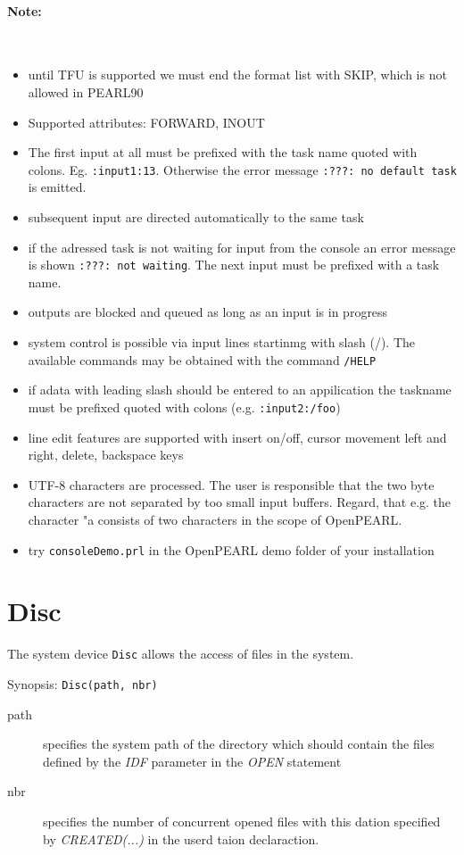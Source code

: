 \paragraph{Note:}\ 
\begin{itemize}
\item until TFU is supported we must end the format list with SKIP, 
   which is not allowed in PEARL90
\item Supported attributes: FORWARD, INOUT
\item The first input at all must be prefixed with the task name
 quoted with colons. Eg. \verb|:input1:13|. Otherwise the error message
 \verb|:???: no default task| is emitted.
\item subsequent input are directed automatically to the same task
\item if the adressed task is not waiting for input from the console an
  error message is shown \verb|:???: not waiting|. The next input must be 
  prefixed with a task name.
\item outputs are blocked and queued as long as an input is in progress
\item system control is possible via input lines startinmg with slash (/).
  The available commands may be obtained with the command \verb|/HELP|
\item if adata with leading slash should  be entered to an appilication
   the taskname must be prefixed quoted with colons (e.g. \verb|:input2:/foo|)
\item line edit features are supported with 
   insert on/off, cursor movement left and right, delete, backspace keys
\item UTF-8 characters are processed. The user is responsible that 
   the two byte characters are not separated by too small input buffers.
   Regard, that e.g. the character "a consists of  two characters in the 
   scope of OpenPEARL.
\item try \verb|consoleDemo.prl|  in the OpenPEARL demo folder of your installation
\end{itemize}

\section{Disc}
The system device \verb|Disc| allows the access of files in the system.

Synopsis: \verb|Disc(path, nbr)|

\begin{description}
\item [path] specifies the system path of the directory which should contain
    the files defined by the {\em IDF} parameter in the {\em OPEN} statement
\item[nbr] specifies the number of concurrent opened files with this dation
     specified by {\em CREATED(...)} in the userd taion declaraction.
\end{description}

